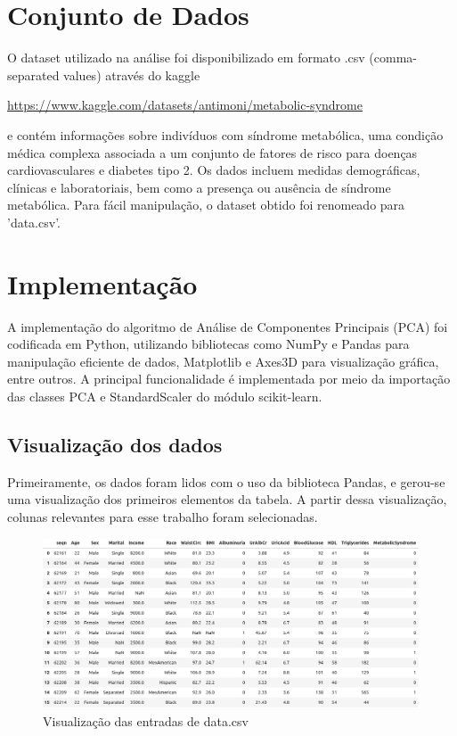 \documentclass[12pt, a4paper]{article}
\begin{document}
\section{Conjunto de Dados}

O dataset utilizado na análise foi disponibilizado em formato .csv (comma-separated values) através do kaggle 
\begin{center}
\url{ https://www.kaggle.com/datasets/antimoni/metabolic-syndrome }
\end{center} e contém informações sobre indivíduos com síndrome metabólica, uma condição médica complexa associada a um conjunto de fatores de risco para doenças cardiovasculares e diabetes tipo 2. Os dados incluem medidas demogr\'{a}ficas, clínicas e laboratoriais, bem como a presença ou ausência de síndrome metabólica. Para fácil manipulação, o dataset obtido foi renomeado para 'data.csv'.

\section{Implementação}
A implementação do algoritmo de Análise de Componentes Principais (PCA) foi codificada em Python, utilizando bibliotecas como NumPy e Pandas para manipulação eficiente de dados, Matplotlib e Axes3D para visualização gráfica, entre outros. A principal funcionalidade é implementada por meio da importação das classes PCA e StandardScaler do módulo scikit-learn.
\subsection{Visualização dos dados}
Primeiramente, os dados foram lidos com o uso da biblioteca Pandas, e gerou-se uma visualização dos primeiros elementos da tabela. A partir dessa visualização, colunas relevantes para esse trabalho foram selecionadas. 

\break

\begin{figure}[h]
    \centering
    \includegraphics[scale=0.4]{img/head.png}
    \caption{Visualização das entradas de data.csv}
\end{figure}
\end{document}
